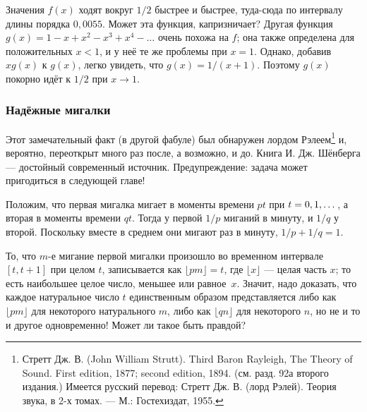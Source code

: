 Значения $f(x)$ ходят вокруг $1/2$ быстрее и быстрее, туда-сюда по интервалу длины порядка $0{,}0055$. 
Может эта функция, капризничает?
Другая функция $g(x)=1-x+x^2-x^3+x^4-\dots$ очень похожа на $f$;
она также определена для положительных $x < 1$, и у неё те же проблемы при $x = 1$.
Однако, добавив $xg(x)$ к $g(x)$, легко увидеть, что $g(x)=1/(x+1)$.
Поэтому $g(x)$ покорно идёт к $1/2$ при $x \to 1$.


\subsubsection*{Надёжные мигалки}

Этот замечательный факт (в другой фабуле) был обнаружен лордом Рэлеем\footnote{Стретт Дж. В. (John William Strutt). Third Baron Rayleigh, The Theory of Sound. First edition, 1877; second edition, 1894. (см. разд. 92а второго издания.) Имеется русский перевод: Стретт Дж. В. (лорд Рэлей). Теория звука, в 2-х томах. — М.: Гостехиздат, 1955.\pr} и, вероятно, переоткрыт много раз после, а возможно, и до.
Книга И. Дж. Шёнберга \cite{52} --- достойный современный источник. Предупреждение: задача может пригодиться в следующей главе!

Положим, что первая мигалка мигает в моменты времени $pt$ при $t \z= 0, 1, \dots$, а вторая в моменты времени $qt$.
Тогда у первой $1/p$ миганий в минуту, и $1/q$ у второй.
Поскольку вместе в среднем они мигают раз в минуту,  $1/p + 1/q = 1$.

То, что $m$-е мигание первой мигалки произошло во временном интервале $[t, t + 1]$ при целом $t$,
записывается как $\lfloor pm\rfloor = t$, где $\lfloor x\rfloor$ --- целая часть $x$; то есть наибольшее целое число, меньшее или равное~$x$.
Значит, надо доказать, что каждое натуральное число $t$ единственным образом представляется либо как $\lfloor pm\rfloor$ для некоторого натурального $m$, либо как $\lfloor qn\rfloor$ для некоторого $n$, но не и то и другое одновременно!
Может ли такое быть правдой?


